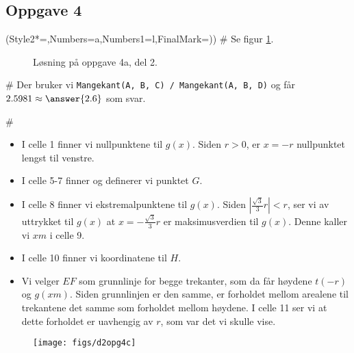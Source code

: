 \subsection*{Oppgave 4}
\begin{easylist}[enumerate]
	\ListProperties(Style2*=,Numbers=a,Numbers1=l,FinalMark={)})
	# Se figur \ref{fig:del2_oppg4_a}.
	
	\begin{figure}[ht!]
		\centering
		\caption{Løsning på oppgave 4a, del 2.}
		\label{fig:del2_oppg4_a}
	\end{figure}
	
	# Der bruker vi \verb|Mangekant(A, B, C) / Mangekant(A, B, D)| og får $2.5981 \approx \answer{2.6}$ som svar.
	
	# \begin{itemize}
		\item I celle 1 finner vi nullpunktene til $ g(x) $. Siden $ r>0 $, er $ x=-r $ nullpunktet lengst til venstre.
		\item I celle 5-7 finner og definerer vi punktet $ G $.
		\item I celle 8 finner vi ekstremalpunktene til $ g(x) $. Siden $ \left|\frac{\sqrt{3}}{3}r\right|<r$, ser vi av uttrykket til $ g(x) $ at $ x=-\frac{\sqrt{3}}{3}r $ er maksimusverdien til $ g(x) $. Denne kaller vi $ xm $ i celle 9.
		\item I celle 10 finner vi koordinatene til $ H $.
		\item Vi velger $ EF $ som grunnlinje for begge trekanter, som da får høydene $ t(-r) $ og $ g(xm) $. Siden grunnlinjen er den samme, er forholdet mellom arealene til trekantene det samme som forholdet mellom høydene. I celle 11 ser vi at dette forholdet er uavhengig av $ r $, som var det vi skulle vise.
	\end{itemize}\begin{figure}
		\centering
		\texttt{[image: figs/d2opg4c]}
	\end{figure}
\end{easylist}





